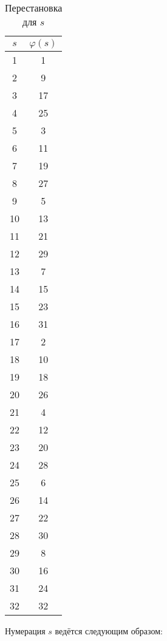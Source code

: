 \documentclass[10pt]{article}
\begin{document}
\begin{table}
  \begin{center}
    \caption {Перестановка для $s$}
    \label{table_shuffle}
    \begin{tabular}{|c|c|} \hline
      $s$ & $\varphi(s)$ \\ \hline
      1 & 1 \\ \hline
      2 & 9 \\ \hline
      3 & 17 \\ \hline
      4 & 25 \\ \hline
      5 & 3 \\ \hline
      6 & 11 \\ \hline
      7 & 19 \\ \hline
      8 & 27 \\ \hline
      9 & 5 \\ \hline
      10 & 13 \\ \hline
      11 & 21 \\ \hline
      12 & 29 \\ \hline
      13 & 7 \\ \hline
      14 & 15 \\ \hline
      15 & 23 \\ \hline
      16 & 31 \\ \hline
      17 & 2 \\ \hline
      18 & 10 \\ \hline
      19 & 18 \\ \hline
      20 & 26 \\ \hline
      21 & 4 \\ \hline
      22 & 12 \\ \hline
      23 & 20 \\ \hline
      24 & 28 \\ \hline
      25 & 6 \\ \hline
      26 & 14 \\ \hline
      27 & 22 \\ \hline
      28 & 30 \\ \hline
      29 & 8 \\ \hline
      30 & 16 \\ \hline
      31 & 24 \\ \hline
      32 & 32 \\ \hline
    \end{tabular}
  \end{center}
\end{table}

Нумерация $s$ ведётся следующим образом:
\end{document}
